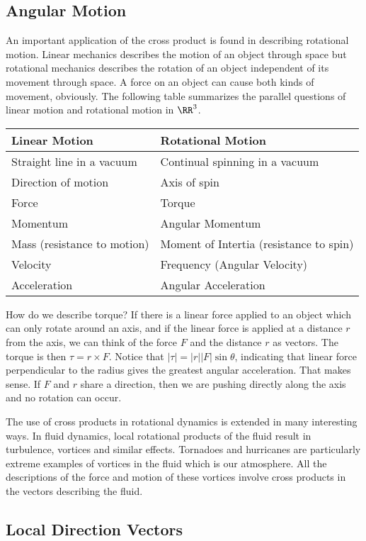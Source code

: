 \documentclass[fleqn]{report}
\begin{document}
\subsection{Angular Motion}
\label{angular-motion}

An important application of the cross product is found in describing
rotational motion. Linear mechanics describes the motion of
an object through space but rotational mechanics describes the
rotation of an object independent of its movement through
space. A force on an object can cause both kinds of movement,
obviously. The following table summarizes the parallel questions of
linear motion and rotational motion in $\RR^3$.

\begin{tabular}{l|l}
Linear Motion & Rotational Motion \\
\hline
Straight line in a vacuum & Continual spinning in a vacuum \\
Direction of motion & Axis of spin \\
Force & Torque \\
Momentum & Angular Momentum \\
Mass (resistance to motion) & Moment of Intertia (resistance
to spin) \\
Velocity & Frequency (Angular Velocity) \\
Acceleration & Angular Acceleration
\end{tabular}

How do we describe torque? If there is a linear force applied
to an object which can only rotate around an axis, and if
the linear force is applied at a distance $r$ from the axis,
we can think of the force $F$ and the distance $r$ as vectors.
The torque is then $\tau = r \times F$. Notice that $|\tau|
= |r||F| \sin \theta$, indicating that linear force
perpendicular to the radius gives the greatest angular
acceleration. That makes sense. If $F$ and $r$ share a
direction, then we are pushing directly along the axis and no
rotation can occur. 

The use of cross products in rotational dynamics is extended
in many interesting ways. In fluid dynamics, local rotational
products of the fluid result in turbulence, vortices
 and similar effects. Tornadoes and
hurricanes are particularly extreme examples of vortices
in the fluid which is our atmosphere. All the
descriptions of the force and motion of these vortices involve
cross products in the vectors describing the fluid. 

\subsection{Local Direction Vectors}
\label{local-direction-vectors}
\end{document}
